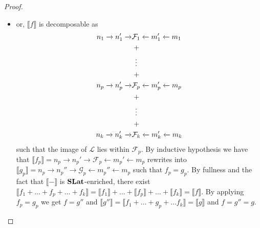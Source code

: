 \begin{proof}
\begin{itemize}
		\item or, $\llbracket f \rrbracket$ is decomposable as
		\begin{align*}
			n_1 \xrightarrow{} n_1' \xrightarrow{} &\mathcal{F}_1 \xleftarrow{} m_1' \xleftarrow{} m_1\\
			&\;+\\
			&\vdotswithin{+}\\
			&\;+\\
			n_p \xrightarrow{} n_p' \xrightarrow{} &\mathcal{F}_p \xleftarrow{} m_p' \xleftarrow{} m_p\\
			&\;+\\
			&\vdotswithin{+}\\
			&\;+\\
			n_k \xrightarrow{} n_k' \xrightarrow{} &\mathcal{F}_k \xleftarrow{} m_k' \xleftarrow{} m_k
		\end{align*}
		such that the image of $\mathcal{L}$ lies within $\mathcal{F}_{p}$.
		By inductive hypothesis we have that $\llbracket f_{p} \rrbracket = n_p \xrightarrow{} n_{p}' \xrightarrow{} \mathcal{F}_{p} \xleftarrow{} m_{p}' \xleftarrow{} m_{p}$ rewrites into $\llbracket g_{p} \rrbracket = n_p \xrightarrow{} n_{p}'' \xrightarrow{} \mathcal{G}_{p} \xleftarrow{} m_{p}'' \xleftarrow{} m_{p}$ such that $f_{p} = g_{p}$.
		By fullness and the fact that $\llbracket - \rrbracket$ is $\mathbf{SLat}$-enriched, there exist $\llbracket f_1 + \ldots + f_{p} + \ldots + f_{k} \rrbracket = \llbracket f_{1} \rrbracket + \ldots + \llbracket f_{p} \rrbracket + \ldots + \llbracket f_{k} \rrbracket = \llbracket f \rrbracket$.
		By applying $f_{p} = g_{p}$ we get $f = g''$ and $\llbracket g'' \rrbracket = \llbracket f_{1} + \ldots + g_{p} + \ldots f_{k} \rrbracket = \llbracket g \rrbracket$ and $f = g'' = g$.
\end{itemize}


\end{proof}
